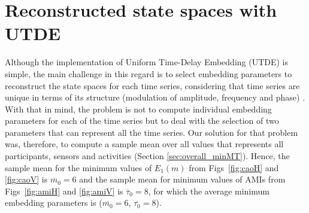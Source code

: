\section{Reconstructed state spaces with UTDE}
Although the implementation of Uniform Time-Delay Embedding (UTDE) 
is simple, the main challenge in this regard is to select embedding parameters 
to reconstruct the state spaces for each time series, considering that time 
series are unique in terms of its structure (modulation of amplitude, 
frequency and phase) \citep{ frank2010, sama2013, bradley2015}.
With that in mind, the problem is not to compute individual embedding 
parameters for each of the time series but to deal with the selection of 
two parameters that can represent all the time series. 
Our solution for that problem was, therefore, to compute a sample mean over 
all values that represents all participants, sensors and activities 
(Section \ref{sec:overall_minMT}).
Hence, the sample mean for the minimum values of $E_{1}(m)$ from 
Figs~\ref{fig:caoH} and \ref{fig:caoV} is $\overline{m}_0=6$ and the sample 
mean for minimum values of AMIs from Figs~\ref{fig:amiH} and \ref{fig:amiV} 
is $\overline{\tau}_0=8$, for which the average minimum embedding parameters 
is ($\overline{m_0}=6$, $\overline{\tau_0}=8$).


